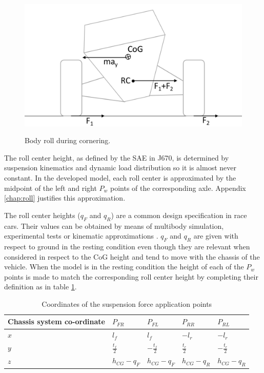 \begin{figure}[ht]
  \centering
  \includegraphics[height = 7cm]{images/roll}
  \caption{Body roll during cornering.}
  \label{roll}
\end{figure}

The roll center height, as defined by the SAE in J670, is determined by suspension kinematics and dynamic load distribution so it is almost never constant.
In the developed model, each roll center is approximated by the midpoint of the left and right $P_w$ points of the corresponding axle. Appendix \ref{chap:roll} justifies this approximation.

The roll center heights ($q_F$ and $q_R$) are a common design specification in race cars.
Their values can be obtained by means of multibody simulation, experimental tests or kinematic approximations \cite{gillespie}.
$q_F$ and $q_R$ are given with respect to ground in the resting condition even though they are relevant when considered in respect to the CoG height and tend to move with the chassis of the vehicle.
When the model is in the resting condition the height of each of the $P_w$ points is made to match the corresponding roll center height by completing their definition as in table \ref{table:susppoints}.

\begin{table}[ht]
  \caption{Coordinates of the suspension force application points} %
  \centering %
  \begin{tabular}{l l l l l} %
    \hline\hline %
    Chassis system co-ordinate & $P_{FR}$ & $P_{FL}$ & $P_{RR}$ & $P_{RL}$ \\ [0.5ex] %
    \hline %
    $ x$ & $ l_f$ & $ l_f$ & $-l_r $ & $-l_r $\\ %
    $ y$ & $ \frac{t_f}{2} $ & $ -\frac{t_f}{2}$ & $ \frac{t_r}{2}$ & $ -\frac{t_r}{2}$\\ %
    $ z$ & $ h_{CG} - q_F $& $ h_{CG} - q_F $ & $ h_{CG} - q_R$ & $ h_{CG} - q_R$ \\ [1ex] %
    \hline %
  \end{tabular}
  \label{table:susppoints} %
\end{table}

